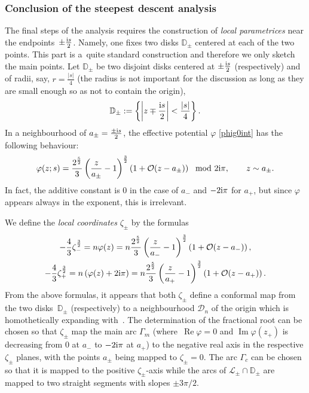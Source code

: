 \documentclass[pdftex]{sigma}
\numberwithin{equation}{section}
\theoremstyle{definition}
\def \scr{\mathscr}
\def \DD{\mathbb D}
\def\le{\left}
\def\ri{\right}
\def \Re{\operatorname{Re} }
\def \Im {\operatorname{Im} }
\begin{document}
\subsubsection{Conclusion of the steepest descent analysis}
\label{Errorg0}
%
The final steps of the analysis requires the construction of {\it local parametrices} near the endpoints~$\pm \frac {{\rm i}s}2$. Namely, one fixes two disks $\mathbb D_\pm$ centered at each of the two points. This part is a~quite standard construction and therefore we only sketch the main points.
%
Let $\DD_\pm$ be two disjoint disks centered at $\pm \frac {{\rm i}s}2$ (respectively) and of radii, say, $r=\frac{|s|}4$ (the radius is not important for the discussion as long as they are small enough so as not to contain the origin),
\[
\DD_\pm:= \left \{\le|z\mp \frac{{\rm i}s}2\ri|<\frac {|s|}4 \ri \}.
\]
In a neighbourhood of $a_\pm=\frac {\pm {\rm i}s}2$, the effective potential $\varphi$ \eqref{phig0int} has the following behaviour:
\[
\varphi(z;s) = \frac {2^\frac 52}3 \le(\frac {z}{a_\pm } -1\ri)^\frac 32\le(1 + \mathcal O(z-a_\pm)\ri) \mod 2{\rm i}\pi,\qquad z\sim a_\pm.
\]
In fact, the additive constant is $0$ in the case of $a_-$ and $-2{\rm i}\pi$ for $a_+$, but since $\varphi$ appears always in the exponent, this is irrelevant.

We define the \emph{local coordinates} $\zeta_\pm $ by the formulas
\begin{gather*}
-\frac 4 3\zeta_-^{\frac 32} = n\varphi(z) = n\frac {2^\frac 52}3 \le(\frac {z}{a_- } -1\ri)^\frac 32\le(1 + \mathcal O(z-a_-)\ri),
\\
-\frac 43\zeta_+^{\frac 32} = n\le(\varphi(z) +2{\rm i}\pi \ri)=n \frac {2^\frac 52}3 \le(\frac {z}{a_+ } -1\ri)^\frac 32\le(1 + \mathcal O(z-a_+)\ri).
\end{gather*}
From the above formulas, it appears that both $\zeta_\pm$ define a conformal map from the two disks~$\DD_\pm $ (respectively) to a neighbourhood $\scr D_n$ of the origin which is homothetically expanding with~. The determination of the fractional root can be chosen so that $\zeta_\pm$ map the main arc $\Gamma_m$ (where~${\Re \varphi=0}$ and $\Im \varphi(z_+)$ is decreasing from $0$ at $a_-$ to $-2{\rm i}\pi$ at $a_+$) to the negative real axis in the respective $\zeta_\pm$ planes, with the points $a_\pm$ being mapped to $\zeta_\pm =0$. The arc $\Gamma_c$ can be chosen so that it is mapped to the positive $\zeta_\pm$-axis while the arcs of $\scr L_\pm\cap \DD_\pm$ are mapped to two straight segments with slopes $\pm 3\pi/2$.
\end{document}
